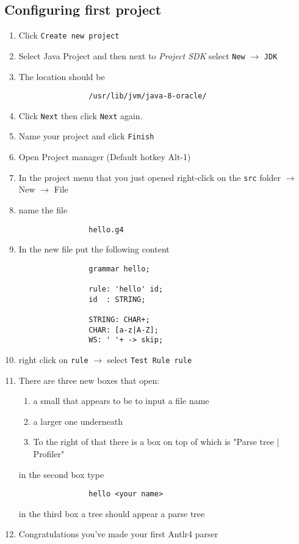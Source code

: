 \documentclass[../setup.tex]{subfiles}
\begin{document}
	\subsection{Configuring first project}
		\begin{enumerate}
			\item Click \texttt{Create new project}

			\item Select Java Project and then next to \textit{Project SDK} select \texttt{New} $\rightarrow$ \texttt{JDK}

			\item The location should be
			\begin{lstlisting}
				/usr/lib/jvm/java-8-oracle/
			\end{lstlisting}

			\item Click \texttt{Next} then click \texttt{Next} again.

			\item Name your project and click \texttt{Finish}

			\item Open Project manager (Default hotkey Alt-1)

			\item In the project menu that you just opened right-click on the \texttt{src} folder $\rightarrow$ New $\rightarrow$ File

			\item name the file
			\begin{lstlisting}
				hello.g4
			\end{lstlisting}

			\item In the new file put the following content
			\begin{lstlisting}
				grammar hello;

				rule: 'hello' id;
				id  : STRING;

				STRING: CHAR+;
				CHAR: [a-z|A-Z];
				WS: ' '+ -> skip;
			\end{lstlisting}

			\item right click on \texttt{rule} $\rightarrow$ select \texttt{Test Rule rule}

			\item There are three new boxes that open:
			\begin{enumerate}
				\item a small that appears to be to input a file name
				\item a larger one underneath
				\item To the right of that there is a box on top of which is "Parse tree | Profiler"
			\end{enumerate}
			in the second box type
			\begin{lstlisting}
				hello <your name>
			\end{lstlisting}
			in the third box a tree should appear a parse tree

			\item Congratulations you've made your first Antlr4 parser

		\end{enumerate}
\end{document}
